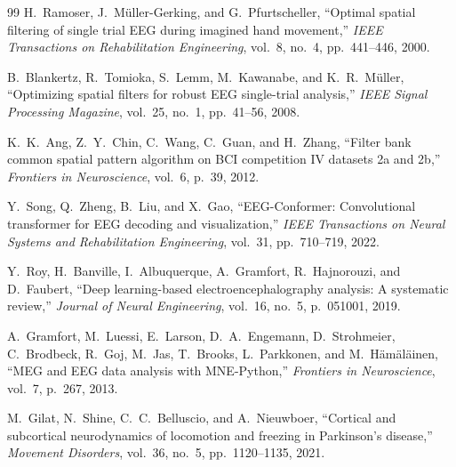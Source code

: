 \documentclass[11pt,a4paper]{article}
\begin{document}
\begin{thebibliography}{99}
H.~Ramoser, J.~M\"{u}ller-Gerking, and G.~Pfurtscheller, ``Optimal spatial filtering of single trial EEG during imagined hand movement,'' \textit{IEEE Transactions on Rehabilitation Engineering}, vol.~8, no.~4, pp.~441--446, 2000.

B.~Blankertz, R.~Tomioka, S.~Lemm, M.~Kawanabe, and K.~R.~M\"{u}ller, ``Optimizing spatial filters for robust EEG single-trial analysis,'' \textit{IEEE Signal Processing Magazine}, vol.~25, no.~1, pp.~41--56, 2008.

K.~K.~Ang, Z.~Y.~Chin, C.~Wang, C.~Guan, and H.~Zhang, ``Filter bank common spatial pattern algorithm on BCI competition IV datasets 2a and 2b,'' \textit{Frontiers in Neuroscience}, vol.~6, p.~39, 2012.

Y.~Song, Q.~Zheng, B.~Liu, and X.~Gao, ``EEG-Conformer: Convolutional transformer for EEG decoding and visualization,'' \textit{IEEE Transactions on Neural Systems and Rehabilitation Engineering}, vol.~31, pp.~710--719, 2022.

Y.~Roy, H.~Banville, I.~Albuquerque, A.~Gramfort, R.~Hajnorouzi, and D.~Faubert, ``Deep learning-based electroencephalography analysis: A systematic review,'' \textit{Journal of Neural Engineering}, vol.~16, no.~5, p.~051001, 2019.

A.~Gramfort, M.~Luessi, E.~Larson, D.~A.~Engemann, D.~Strohmeier, C.~Brodbeck, R.~Goj, M.~Jas, T.~Brooks, L.~Parkkonen, and M.~H\"{a}m\"{a}l\"{a}inen, ``MEG and EEG data analysis with MNE-Python,'' \textit{Frontiers in Neuroscience}, vol.~7, p.~267, 2013.

M.~Gilat, N.~Shine, C.~C.~Belluscio, and A.~Nieuwboer, ``Cortical and subcortical neurodynamics of locomotion and freezing in Parkinson's disease,'' \textit{Movement Disorders}, vol.~36, no.~5, pp.~1120--1135, 2021.

\end{thebibliography}
\end{document}
